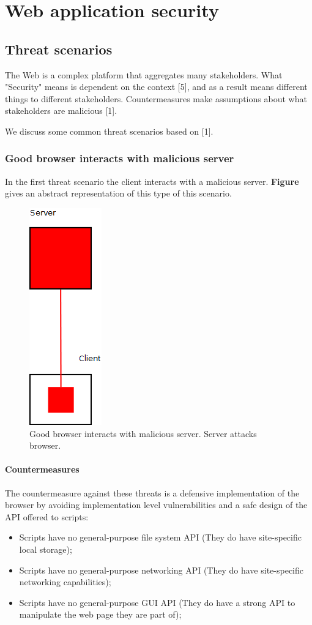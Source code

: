 \chapter{Web application security}\label{chapter:web-application-security}

\section{Threat scenarios}

The Web is a complex platform that aggregates many stakeholders. What "Security" means is dependent on the context [5], and as a result means different things to different stakeholders. Countermeasures make assumptions about what stakeholders are malicious [1].

We discuss some common threat scenarios based on [1].


\subsection{Good browser interacts with malicious server}

In the first threat scenario the client interacts with a malicious server. \textbf{Figure} gives an abstract representation of this type of this scenario.

\begin{figure}
	\begin{center}		
		\includegraphics[width=0.1\columnwidth]{img/security/threat-scenario-good-browser-bad-server}
		\caption{Good browser interacts with malicious server. Server attacks browser.}
		\label{fig:threat-scenario:good-browser-bad-server}
	\end{center}
\end{figure}


\subsubsection{Countermeasures}

The countermeasure against these threats is a defensive implementation of the browser by avoiding implementation level vulnerabilities and a safe design of the API offered to scripts:
\begin{itemize}
	\item Scripts have no general-purpose file system API (They do have site-specific local storage);
	\item Scripts have no general-purpose networking API (They do have site-specific networking capabilities);
	\item Scripts have no general-purpose GUI API (They do have a strong API to manipulate the web page they are part of);
\end{itemize}

